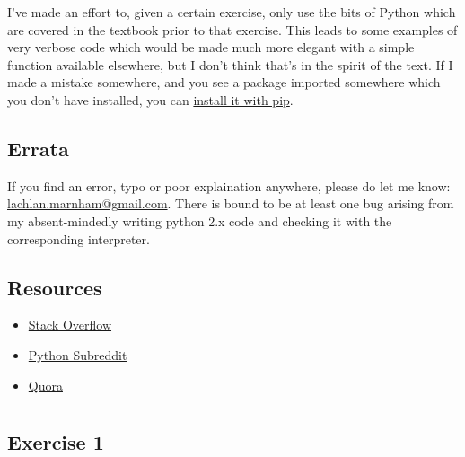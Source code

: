 \documentclass{report}
\begin{document}
I've made an effort to, given a certain exercise, only use the bits of Python which are covered in the textbook prior to that 
exercise. This leads to some examples of very verbose code which would be made much more elegant with a simple function 
available elsewhere, but I don't think that's in the spirit of the text. If I made a mistake somewhere, and you see a package 
imported somewhere which you don't have installed, you can \href{https://pypi.python.org/pypi/pip}{install it with pip}.

\section*{Errata}
If you find an error, typo or poor explaination anywhere, please do let me know: 
\href{lachlan.marnham@gmail.com}{lachlan.marnham@gmail.com}. There is bound to be at least one bug arising from my absent-mindedly 
writing python 2.x code and checking it with the corresponding interpreter.

\section*{Resources}
\begin{itemize}
\item \href{https://www.stackoverflow.com}{Stack Overflow} 
\item \href{https://www.reddit.com/r/Python/}{Python Subreddit}
\item \href{https://www.quora.com}{Quora}
\end{itemize}
\chapter{} %
\section*{Exercise 1}
 
\end{document}
